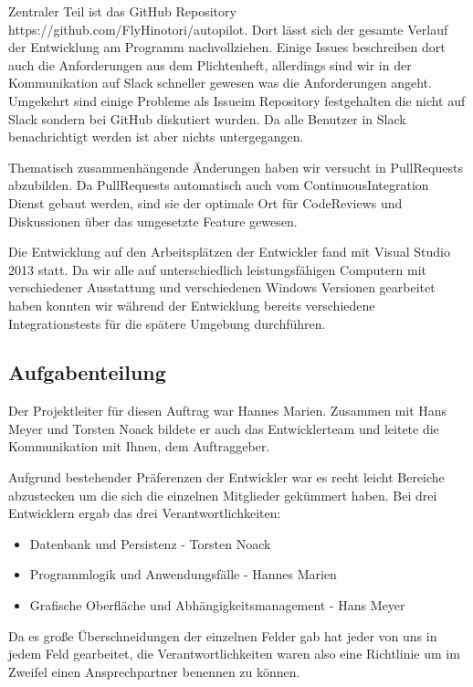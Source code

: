 \documentclass[12pt]{article}
\begin{document}
Zentraler Teil ist das GitHub Repository https://github.com/FlyHinotori/autopilot. Dort lässt sich der gesamte Verlauf der Entwicklung am Programm nachvollziehen. Einige Issues beschreiben dort auch die Anforderungen aus dem Plichtenheft, allerdings sind wir in der Kommunikation auf Slack schneller gewesen was die Anforderungen angeht. Umgekehrt sind einige Probleme als Issueim Repository festgehalten die nicht auf Slack sondern bei GitHub diskutiert wurden. Da alle Benutzer in Slack benachrichtigt werden ist aber nichts untergegangen.

Thematisch zusammenhängende Änderungen haben wir versucht in PullRequests abzubilden. Da PullRequests automatisch auch vom ContinuousIntegration Dienst gebaut werden, sind sie der optimale Ort für CodeReviews und Diskussionen über das umgesetzte Feature gewesen.

Die Entwicklung auf den Arbeitsplätzen der Entwickler fand mit Visual Studio 2013 statt. Da wir alle auf unterschiedlich leistungsfähigen Computern mit verschiedener Ausstattung und verschiedenen Windows Versionen gearbeitet haben konnten wir während der Entwicklung bereits verschiedene Integrationstests für die spätere Umgebung durchführen.

\subsection{Aufgabenteilung}

Der Projektleiter für diesen Auftrag war Hannes Marien. Zusammen mit Hans Meyer und Torsten Noack bildete er auch das Entwicklerteam und leitete die Kommunikation mit Ihnen, dem Auftraggeber.

Aufgrund bestehender Präferenzen der Entwickler war es recht leicht Bereiche abzustecken um die sich die einzelnen Mitglieder gekümmert haben. Bei drei Entwicklern ergab das drei Verantwortlichkeiten: 

\begin{itemize}
  \item Datenbank und Persistenz - Torsten Noack
  \item Programmlogik und Anwendungsfälle - Hannes Marien
  \item Grafische Oberfläche und Abhängigkeitsmanagement - Hans Meyer
\end{itemize}

Da es große Überschneidungen der einzelnen Felder gab hat jeder von uns in jedem Feld gearbeitet, die Verantwortlichkeiten waren also eine Richtlinie um im Zweifel einen Ansprechpartner benennen zu können.
\newline
\end{document}
